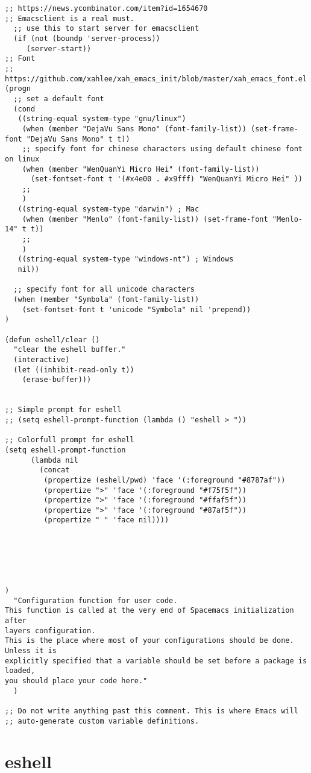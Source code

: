 \documentclass[11pt]{article}
\begin{document}
\begin{verbatim}
;; https://news.ycombinator.com/item?id=1654670
;; Emacsclient is a real must.
  ;; use this to start server for emacsclient
  (if (not (boundp 'server-process))
     (server-start))
;; Font
;; https://github.com/xahlee/xah_emacs_init/blob/master/xah_emacs_font.el
(progn
  ;; set a default font
  (cond
   ((string-equal system-type "gnu/linux")
    (when (member "DejaVu Sans Mono" (font-family-list)) (set-frame-font "DejaVu Sans Mono" t t))
    ;; specify font for chinese characters using default chinese font on linux
    (when (member "WenQuanYi Micro Hei" (font-family-list))
      (set-fontset-font t '(#x4e00 . #x9fff) "WenQuanYi Micro Hei" ))
    ;;
    )
   ((string-equal system-type "darwin") ; Mac
    (when (member "Menlo" (font-family-list)) (set-frame-font "Menlo-14" t t))
    ;;
    )
   ((string-equal system-type "windows-nt") ; Windows
   nil))

  ;; specify font for all unicode characters
  (when (member "Symbola" (font-family-list))
    (set-fontset-font t 'unicode "Symbola" nil 'prepend))
)

(defun eshell/clear ()
  "clear the eshell buffer."
  (interactive)
  (let ((inhibit-read-only t))
    (erase-buffer)))


;; Simple prompt for eshell
;; (setq eshell-prompt-function (lambda () "eshell > "))

;; Colorfull prompt for eshell
(setq eshell-prompt-function
      (lambda nil
        (concat
         (propertize (eshell/pwd) 'face '(:foreground "#8787af"))
         (propertize ">" 'face '(:foreground "#f75f5f"))
         (propertize ">" 'face '(:foreground "#ffaf5f"))
         (propertize ">" 'face '(:foreground "#87af5f"))
         (propertize " " 'face nil))))






)
  "Configuration function for user code.
This function is called at the very end of Spacemacs initialization after
layers configuration.
This is the place where most of your configurations should be done. Unless it is
explicitly specified that a variable should be set before a package is loaded,
you should place your code here."
  )

;; Do not write anything past this comment. This is where Emacs will
;; auto-generate custom variable definitions.
\end{verbatim}


\section{eshell}
\label{sec:org31a7a09}
\end{document}
